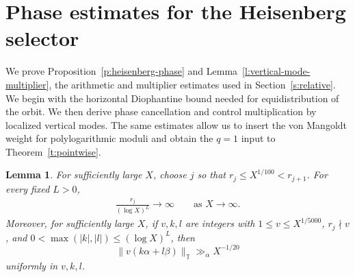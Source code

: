 \documentclass[12pt]{amsart}
\newcommand{\1}{\mathbf 1}
\newtheorem{lemma}[theorem]{Lemma}
\theoremstyle{definition}
\begin{document}
\section{Phase estimates for the Heisenberg selector}\label{s:example}

We prove Proposition~\ref{p:heisenberg-phase} and
Lemma~\ref{l:vertical-mode-multiplier}, the arithmetic and multiplier
estimates used in Section~\ref{s:relative}. We begin with the horizontal
Diophantine bound needed for equidistribution of the orbit.
We then derive phase cancellation and control multiplication by
localized vertical modes. The same estimates allow us to insert
the von Mangoldt weight for polylogarithmic moduli and obtain the
\(q=1\) input to Theorem~\ref{t:pointwise}.

\begin{lemma}\label{l:heisenberg-horizontal}
For sufficiently large \(X\), choose \(j\) so that
\(r_j\leq X^{1/100}<r_{j+1}\). For every fixed \(L>0\),
\begin{align}\label{e:infcondition}
    \frac{r_j}{(\log X)^L}\longrightarrow\infty
 \qquad\text{as }X\to\infty.
\end{align}
Moreover, for sufficiently large \(X\), if \(v,k,l\) are integers
with \(1\leq v\leq X^{1/5000}\), \(r_j\nmid v\), and
\(0<\max(|k|,|l|)\leq(\log X)^L\), then
\[
 \|v(k\alpha+l\beta)\|_{\mathbb T}\gg_\alpha X^{-1/20}
\]
uniformly in \(v,k,l\).
\end{lemma}
\end{document}
